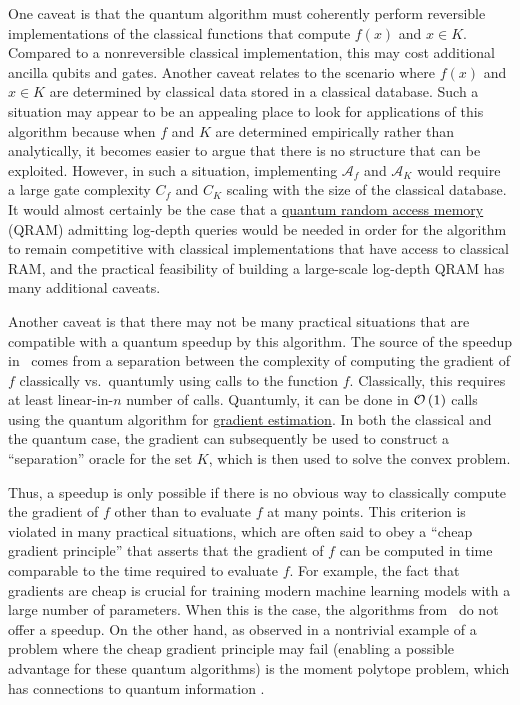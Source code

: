 \begin{refsection}
One caveat is that the quantum algorithm must coherently perform reversible implementations of the classical functions that compute $f(x)$ and $x \in K$. Compared to a nonreversible classical implementation, this may cost additional ancilla qubits and gates. Another caveat relates to the scenario where $f(x)$ and $x\in K$ are determined by classical data stored in a classical database. Such a situation may appear to be an appealing place to look for applications of this algorithm because when $f$ and $K$ are determined empirically rather than analytically, it becomes easier to argue that there is no structure that can be exploited. However, in such a situation, implementing $\mathcal{A}_f$ and $\mathcal{A}_K$ would require a large gate complexity $C_f$ and $C_K$ scaling with the size of the classical database. It would almost certainly be the case that a \hyperref[prim:QRAM]{quantum random access memory} (QRAM) admitting log-depth queries would be needed in order for the algorithm to remain competitive with classical implementations that have access to classical RAM, and the practical feasibility of building a large-scale log-depth QRAM has many additional caveats. 

Another caveat is that there may not be many practical situations that are compatible with a quantum speedup by this algorithm. The source of the speedup in~\cite{chakrabarti2018QuantumConvexOpt, apeldoorn2018ConvexOptUsingQuantumOracles} comes from a separation between the complexity of computing the gradient of $f$ classically vs.~quantumly using calls to the function $f$. Classically, this requires at least linear-in-$n$ number of calls. Quantumly, it can be done in $\mathcal{O}\left( 1 \right)$ calls using the quantum algorithm for \hyperref[prim:GradientEstimation]{gradient estimation}. In both the classical and the quantum case, the gradient can subsequently be used to construct a ``separation'' oracle for the set $K$, which is then used to solve the convex problem. 

Thus, a speedup is only possible if there is no obvious way to classically compute the gradient of $f$ other than to evaluate $f$ at many points. This criterion is violated in many practical situations, which are often said to obey a ``cheap gradient principle'' \cite{griewank2008EvalDerivatives, bolte2022nonsmooth} that asserts that the gradient of $f$ can be computed in time comparable to the time required to evaluate $f$. For example, the fact that gradients are cheap is crucial for training modern machine learning models with a large number of parameters. When this is the case, the algorithms from~\cite{chakrabarti2018QuantumConvexOpt,apeldoorn2018ConvexOptUsingQuantumOracles} do not offer a speedup. On the other hand, as observed in \cite[Footnote 19]{apeldoorn2018ConvexOptUsingQuantumOracles} a nontrivial example of a problem where the cheap gradient principle may fail (enabling a possible advantage for these quantum algorithms) is the moment polytope problem, which has connections to quantum information \cite{burgisser2018EffTensorScalingMomentPolytopes}.


\end{refsection}
